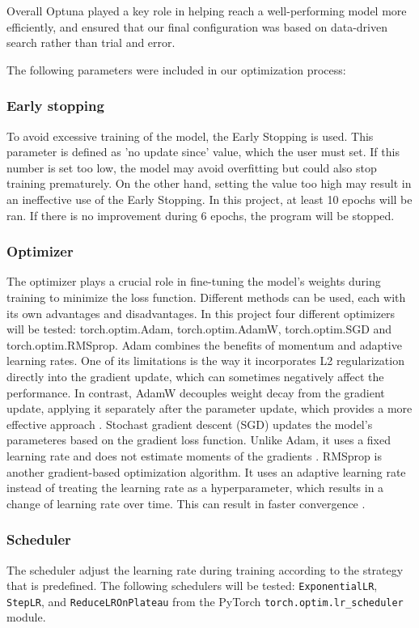\documentclass[twocolumn]{article}
\begin{document}
Overall Optuna played a key role in helping reach a well-performing model more efficiently, and ensured that our final configuration was based on data-driven search rather than trial and error.

The following parameters were included in our optimization process:

\subsubsection{Early stopping}
To avoid excessive training of the model, the Early Stopping is used. 
This parameter is defined as 'no update since' value, which the user must set. 
If this number is set too low, the model may avoid overfitting but could also stop training prematurely. 
On the other hand, setting the value too high may result in an ineffective use of the Early Stopping. 
In this project, at least 10 epochs will be ran. If there is no improvement during 6 epochs, the program will be stopped.

\subsubsection{Optimizer}
The optimizer plays a crucial role in fine-tuning the model's weights during training to minimize the loss function. 
Different methods can be used, each with its own advantages and disadvantages. 
In this project four different optimizers will be tested: torch.optim.Adam, torch.optim.AdamW, torch.optim.SGD and torch.optim.RMSprop. 
Adam combines the benefits of momentum and adaptive learning rates.  
One of its limitations is the way it incorporates L2 regularization directly into the gradient update, which can sometimes negatively affect the performance. 
In contrast, AdamW decouples weight decay from the gradient update, applying it separately after the parameter update, which provides a more effective approach \cite{pykes-2021}.
Stochast gradient descent (SGD) updates the model's parameteres based on the gradient loss function. 
Unlike Adam, it uses a fixed learning rate and does not estimate moments of the gradients \cite{massed-compute-2025}.
RMSprop is another gradient-based optimization algorithm. 
It uses an adaptive learning rate instead of treating the learning rate as a hyperparameter, which results in a change of learning rate over time. 
This can result in faster convergence \cite{sanghvirajit-2025}.

\subsubsection{Scheduler} \label{subsec:Scheduler}
The scheduler adjust the learning rate during training according to the strategy that is predefined. 
The following schedulers will be tested: \texttt{ExponentialLR}, \texttt{StepLR}, and \texttt{ReduceLROnPlateau} from the PyTorch \texttt{torch.optim.lr\_scheduler} module.
\end{document}
